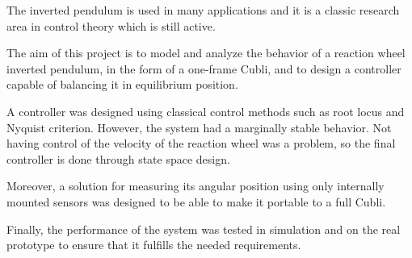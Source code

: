 The inverted pendulum is used in many applications and it is a classic research area in control theory which is still active.

The aim of this project is to model and analyze the behavior of a reaction wheel inverted pendulum, in the form of a one-frame Cubli, and to design a controller capable of balancing it in equilibrium position. 

A controller was designed using classical control methods such as root locus and Nyquist criterion. However, the system had a marginally stable behavior. Not having control of the velocity of the reaction wheel was a problem, so the final controller is done through state space design.

Moreover, a solution for measuring its angular position using only internally mounted sensors was designed to be able to make it portable to a full Cubli. 

Finally, the performance of the system was tested in simulation and on the real prototype to ensure that it fulfills the needed requirements.